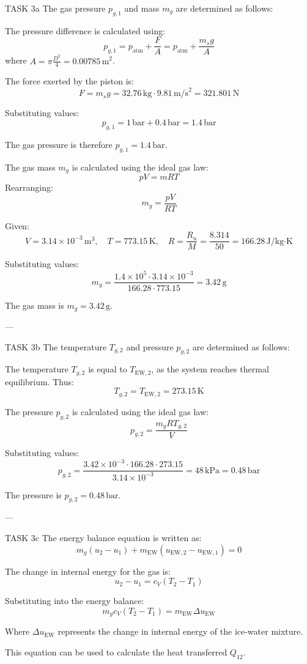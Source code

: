 TASK 3a  
The gas pressure \( p_{g,1} \) and mass \( m_g \) are determined as follows:  

The pressure difference is calculated using:  
\[
p_{g,1} = p_{\text{atm}} + \frac{F}{A} = p_{\text{atm}} + \frac{m_s g}{A}
\]  
where \( A = \pi \frac{D^2}{4} = 0.00785 \, \text{m}^2 \).  

The force exerted by the piston is:  
\[
F = m_s g = 32.76 \, \text{kg} \cdot 9.81 \, \text{m/s}^2 = 321.801 \, \text{N}
\]  

Substituting values:  
\[
p_{g,1} = 1 \, \text{bar} + 0.4 \, \text{bar} = 1.4 \, \text{bar}
\]  

The gas pressure is therefore \( p_{g,1} = 1.4 \, \text{bar} \).  

The gas mass \( m_g \) is calculated using the ideal gas law:  
\[
p V = m R T
\]  
Rearranging:  
\[
m_g = \frac{p V}{R T}
\]  

Given:  
\[
V = 3.14 \times 10^{-3} \, \text{m}^3, \quad T = 773.15 \, \text{K}, \quad R = \frac{R_u}{M} = \frac{8.314}{50} = 166.28 \, \text{J/kg·K}
\]  

Substituting values:  
\[
m_g = \frac{1.4 \times 10^5 \cdot 3.14 \times 10^{-3}}{166.28 \cdot 773.15} = 3.42 \, \text{g}
\]  

The gas mass is \( m_g = 3.42 \, \text{g} \).  

---

TASK 3b  
The temperature \( T_{g,2} \) and pressure \( p_{g,2} \) are determined as follows:  

The temperature \( T_{g,2} \) is equal to \( T_{\text{EW},2} \), as the system reaches thermal equilibrium. Thus:  
\[
T_{g,2} = T_{\text{EW},2} = 273.15 \, \text{K}
\]  

The pressure \( p_{g,2} \) is calculated using the ideal gas law:  
\[
p_{g,2} = \frac{m_g R T_{g,2}}{V}
\]  

Substituting values:  
\[
p_{g,2} = \frac{3.42 \times 10^{-3} \cdot 166.28 \cdot 273.15}{3.14 \times 10^{-3}} = 48 \, \text{kPa} = 0.48 \, \text{bar}
\]  

The pressure is \( p_{g,2} = 0.48 \, \text{bar} \).  

---

TASK 3c  
The energy balance equation is written as:  
\[
m_g (u_2 - u_1) + m_{\text{EW}} (u_{\text{EW},2} - u_{\text{EW},1}) = 0
\]  

The change in internal energy for the gas is:  
\[
u_2 - u_1 = c_V (T_2 - T_1)
\]  

Substituting into the energy balance:  
\[
m_g c_V (T_2 - T_1) = m_{\text{EW}} \Delta u_{\text{EW}}
\]  

Where \( \Delta u_{\text{EW}} \) represents the change in internal energy of the ice-water mixture.  

This equation can be used to calculate the heat transferred \( Q_{12} \).  

